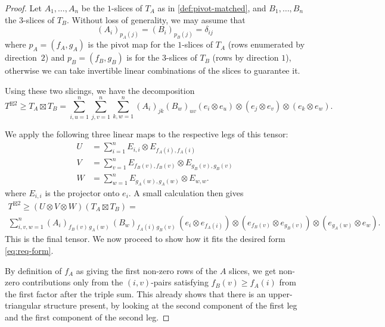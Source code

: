 \documentclass{daj}
\newcommand{\beq}{\begin{equation}}
\newcommand{\eeq}{\end{equation}}
\newcommand{\beqn}{\begin{equation*}}
\newcommand{\eeqn}{\end{equation*}}
\begin{document}
\begin{proof}
Let $A_1,\dots,A_n$ be the $1$-slices of $T_A$ as in \autoref{def:pivot-matched}, and $B_1,\dots,B_n$ the $3$-slices of $T_B$. Without loss of generality, we may assume that
\beq\label{eq:pivot1}
(A_i)_{p_A(j)} = (B_i)_{p_B(j)} = \delta_{ij}
\eeq
where $p_A=(f_A,g_A)$ is the pivot map for the $1$-slices of $T_A$ (rows enumerated by direction~$2$) and $p_B=(f_B,g_B)$ is for the $3$-slices of $T_B$ (rows by direction $1$), otherwise we can take invertible linear combinations of the slices to guarantee it.

%
%
%
%
Using these two slicings, we have the decomposition
\beqn
T^{\boxtimes 2}\geq T_A\boxtimes T_B
=
\sum_{i,u=1}^n\sum_{j,v=1}^n\sum_{k,w=1}^n (A_i)_{jk}(B_w)_{uv} (e_i\otimes e_u)\otimes (e_j\otimes e_v)\otimes (e_k\otimes e_w).
\eeqn

We apply the following three linear maps to the respective legs of this tensor:
\begin{align*}
U &= \sum_{i=1}^n E_{i,i}\otimes E_{f_A(i),f_A(i)}\\
V &= \sum_{v=1}^n E_{f_B(v),f_B(v)}\otimes E_{g_B(v),g_B(v)}\\
W &= \sum_{w=1}^nE_{g_A(w),g_A(w)}\otimes E_{w,w}.
\end{align*}
where $E_{i,i}$ is the projector onto $e_i$.
A small calculation then gives
\begin{multline*}
T^{\boxtimes 2}\geq(U\otimes V\otimes W)(T_A\boxtimes T_B)
=\\
\sum_{i,v,w=1}^n
(A_i)_{f_B(v)\,g_A(w)}\, (B_w)_{f_A(i)\,g_B(v)}\, 
(e_i\otimes e_{f_A(i)})\otimes (e_{f_B(v)}\otimes e_{g_B(v)})\otimes (e_{g_A(w)}\otimes e_w).
\end{multline*}
This is the final tensor. We now proceed to show how it fits the desired form \eqref{eq:req-form}.

By definition of $f_A$ as giving the first non-zero rows of the $A$ slices, we get non-zero contributions only from the $(i,v)$-pairs satisfying $f_B(v) \geq f_A(i)$ from the first factor after the triple sum.
This already shows that there is an upper-triangular structure present, by looking at the second component of the first leg and the first component of the second leg.


\end{proof}
\end{document}
